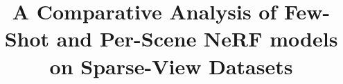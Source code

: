\documentclass[10pt,conference]{IEEEtran}
\begin{document}
\title{A Comparative Analysis of Few-Shot and Per-Scene NeRF models on Sparse-View Datasets}






% 


\maketitle
\end{document}

